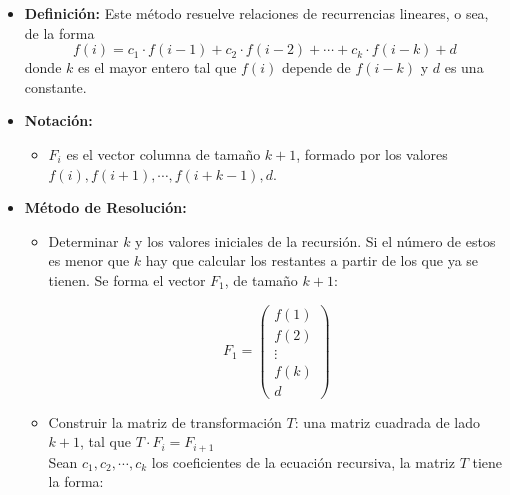 \begin{itemize}
    \item{
		\textbf{Definici\'on:}
		Este m\'etodo resuelve relaciones de recurrencias lineares, o sea, de la forma 
		$$ f(i) = c_1 \cdot f(i-1) + c_2 \cdot f(i-2) + \cdots + c_k \cdot f(i-k) + d$$
		donde $k$ es el mayor entero tal que $f(i)$ depende de $f(i-k)$  y $d$ es una constante. 
	}
    \item{
		\textbf{Notaci\'on:} 
		\begin{itemize}  
			\item{
			     $F_i$ es el vector columna de tama\~no $k+1$, formado por los valores 
			     $f(i), f(i+1), \cdots, f(i+k-1), d$.
			     
		    }
		\end{itemize}  
    }
    \item{
		\textbf{M\'etodo de Resoluci\'on:}
			\begin{itemize}
				\item{
					Determinar $k$ y los valores iniciales de la recursi\'on. Si el n\'umero de estos es menor que $k$
					hay que calcular los restantes a partir de los que ya se tienen. Se forma el vector $F_1$, de 
					tama\~no $k+1$:
					
					$$F_1 = 
						\begin{pmatrix}
							f(1) 		\\
							f(2)		\\
							\vdots		\\
							f(k)		\\
							d
						\end{pmatrix}
					$$
				}
				\item{
					Construir la matriz de transformaci\'on $T$: una matriz cuadrada de lado $k+1$, tal que 
					$ T \cdot F_i = F_{i+1}$ \\
					Sean $c_1, c_2, \cdots, c_k$ los coeficientes de la ecuaci\'on recursiva, la matriz $T$ tiene la forma:
					
}
\end{itemize}}
\end{itemize}
